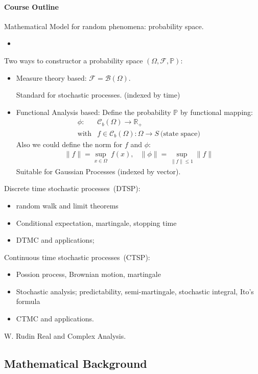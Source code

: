 \paragraph{Course Outline}
Mathematical Model for random phenomena: probability space.
\begin{itemize}
\item

\end{itemize}
Two ways to constructor a probability space $(\Omega,\mathcal{F},\mathbb{P})$:
\begin{itemize}
\item
Measure theory based: $\mathcal{F}=\mathcal{B}(\Omega)$.

Standard for stochastic processes. (indexed by time)
\item
Functional Analysis based: 
Define the probability $\mathbb{P}$ by functional mapping:
\[
\begin{array}{ll}
\phi:&\mathcal{C}_b(\Omega)\to\mathbb{R}_+\\
\text{with}&f\in\mathcal{C}_b(\Omega): \Omega\to S~\mbox{(state space)}
\end{array}
\]
Also we could define the norm for $f$ and $\phi$:
\[
\begin{array}{ll}
\|f\|=\sup\limits_{x\in\Omega}~f(x),
&
\|\phi\|=\sup\limits_{\|f\|\le 1}\|f\|
\end{array}
\]
Suitable for Gaussian Processes (indexed by vector).
\end{itemize}

Discrete time stochastic processes~(DTSP):
\begin{itemize}
\item
random walk and limit theorems
\item
Conditional expectation, martingale, stopping time
\item
DTMC and applications;
\end{itemize}

Continuous time stochastic processes~(CTSP):
\begin{itemize}
\item
Possion process, Brownian motion, martingale
\item
Stochastic analysis; predictability, semi-martingale, stochastic integral, Ito's formula
\item
CTMC and applications.
\end{itemize}

W. Rudin Real and Complex Analysis.

\subsection{Mathematical Background}
